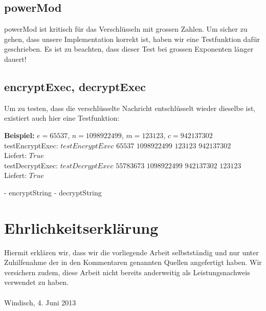 \documentclass[a4paper, 11pt]{article} %
\begin{document}
\subsection{powerMod}
powerMod ist kritisch für das Verschlüsseln mit grossen Zahlen. Um sicher zu gehen, dass unsere Implementation korrekt ist, haben wir eine Testfunktion dafür geschrieben. Es ist zu beachten, dass dieser Test bei grossen Exponenten länger dauert!


\subsection{encryptExec, decryptExec}
Um zu testen, dass die verschlüsselte Nachricht entschlüsselt wieder dieselbe ist, existiert auch hier eine Testfunktion:

\textbf{Beispiel:} $e=65537$, $n=1098922499$, $m=123123$, $c=942137302$\\
testEncryptExec: $testEncryptExec$ $65537$ $1098922499$ $123123$ $942137302$\\
Liefert: $True$\\
testDecryptExec: $testDecryptExec$ $55783673$ $1098922499$ $942137302$ $123123$\\
Liefert: $True$

- encryptString
- decryptString

\section{Ehrlichkeitserklärung}
Hiermit erklären wir, dass wir die vorliegende Arbeit selbstständig und nur unter Zuhilfenahme der in den Kommentaren genannten Quellen angefertigt haben. Wir versichern zudem, diese Arbeit nicht bereits anderweitig als Leistungsnachweis verwendet zu haben.\\\\
Windisch, 4. Juni 2013
\end{document}
